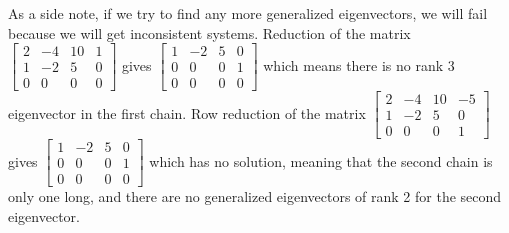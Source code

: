 \begin{example}
As a side note, if we try to find any more generalized eigenvectors, we will fail because we will get inconsistent systems. Reduction of the matrix 
$ \begin{bmatrix} 2&-4&10&1\\1&-2&5&0
\\0&0&0&0\end{bmatrix} 
$ gives $\begin{bmatrix} 1&-2&5&0\\0&0&0&1
\\0&0&0&0\end{bmatrix}$ which means there is no rank 3 eigenvector in the first chain. Row reduction of the matrix 
$ \begin{bmatrix} 2&-4&10&-5\\1&-2&5&0
\\0&0&0&1\end{bmatrix} 
$ gives $\begin{bmatrix} 1&-2&5&0\\0&0&0&1
\\0&0&0&0\end{bmatrix}$ which has no solution, meaning that the second chain is only one long, and there are no generalized eigenvectors of rank 2 for the second eigenvector.  
\end{example}

